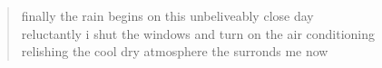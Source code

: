 
\begin{verse}
finally the rain begins on this unbeliveably close day \\
reluctantly i shut the windows and turn on the air conditioning \\
relishing the cool dry atmosphere the surronds me now 
\end{verse}
